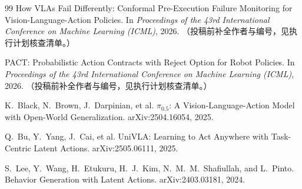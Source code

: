 \documentclass[11pt,a4paper]{ctexart}
\begin{document}
\begin{thebibliography}{99}
How VLAs Fail Differently: Conformal Pre-Execution Failure Monitoring for Vision-Language-Action Policies.
In \emph{Proceedings of the 43rd International Conference on Machine Learning (ICML)}, 2026.
（投稿前补全作者与编号，见执行计划核查清单。）

PACT: Probabilistic Action Contracts with Reject Option for Robot Policies.
In \emph{Proceedings of the 43rd International Conference on Machine Learning (ICML)}, 2026.
（投稿前补全作者与编号，见执行计划核查清单。）

K.~Black, N.~Brown, J.~Darpinian, et al.
$\pi_{0.5}$: A Vision-Language-Action Model with Open-World Generalization.
arXiv:2504.16054, 2025.

Q.~Bu, Y.~Yang, J.~Cai, et al.
UniVLA: Learning to Act Anywhere with Task-Centric Latent Actions.
arXiv:2505.06111, 2025.

S.~Lee, Y.~Wang, H.~Etukuru, H.~J.~Kim, N.~M.~M.~Shafiullah, and L.~Pinto.
Behavior Generation with Latent Actions.
arXiv:2403.03181, 2024.

\end{thebibliography}
\end{document}
